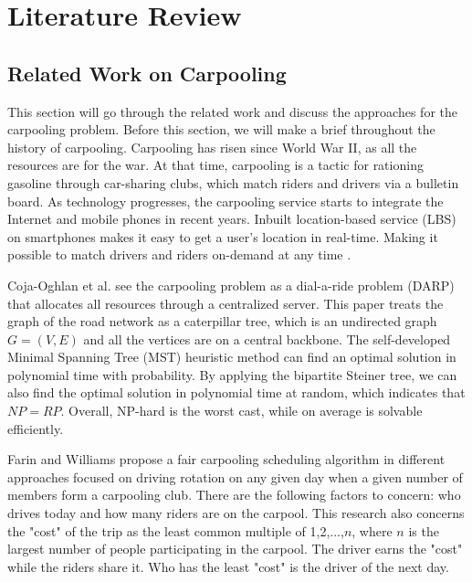 
\chapter{Literature Review}

\section{Related Work on Carpooling}

This section will go through the related work and discuss the approaches for the carpooling problem. Before this section, we will make a brief throughout the history of carpooling. Carpooling has risen since World War II, as all the resources are for the war. At that time, carpooling is a tactic for rationing gasoline through car-sharing clubs, which match riders and drivers via a bulletin board. As technology progresses, the carpooling service starts to integrate the Internet and mobile phones in recent years. Inbuilt location-based service (LBS) on smartphones makes it easy to get a user's location in real-time. Making it possible to match drivers and riders on-demand at any time \cite{chan_ridesharing_2012}.

Coja-Oghlan et al. \cite{coja-oghlan_average_2003} see the carpooling problem as a dial-a-ride problem (DARP) that allocates all resources through a centralized server. This paper treats the graph of the road network as a caterpillar tree, which is an undirected graph $G = (V, E)$ and all the vertices are on a central backbone. The self-developed Minimal Spanning Tree (MST) heuristic method can find an optimal solution in polynomial time with probability. By applying the bipartite Steiner tree, we can also find the optimal solution in polynomial time at random, which indicates that $NP = RP$. Overall, NP-hard is the worst cast, while on average is solvable efficiently.

Farin and Williams \cite{fagin_fair_1983} propose a fair carpooling scheduling algorithm in different approaches focused on driving rotation on any given day when a given number of members form a carpooling club. There are the following factors to concern: who drives today and how many riders are on the carpool. This research also concerns the "cost" of the trip as the least common multiple of 1,2,...,$n$, where $n$ is the largest number of people participating in the carpool. The driver earns the "cost" while the riders share it. Who has the least "cost" is the driver of the next day.

